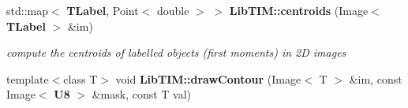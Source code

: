 \begin{CompactItemize}
std::map$<$ {\bf TLabel}, Point$<$ double $>$ $>$ {\bf Lib\-TIM::centroids} (Image$<$ {\bf TLabel} $>$ \&im)
\begin{CompactList}\small\item\em compute the centroids of labelled objects (first moments) in 2D images \item\end{CompactList}\item 
template$<$class T$>$ void {\bf Lib\-TIM::draw\-Contour} (Image$<$ T $>$ \&im, const Image$<$ {\bf U8} $>$ \&mask, const T val)
\end{CompactItemize}

